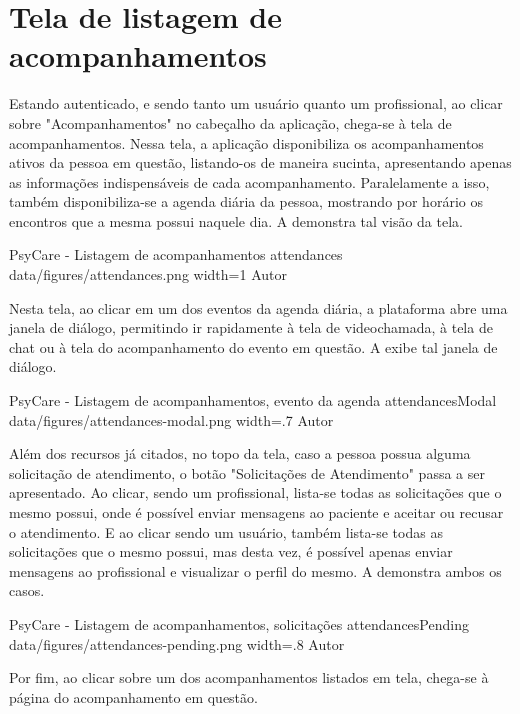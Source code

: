 \section{Tela de listagem de acompanhamentos}
\label{sec:acompanhamentos}

Estando autenticado, e sendo tanto um usuário quanto um profissional, ao clicar sobre "Acompanhamentos" no cabeçalho da aplicação, chega-se à tela de acompanhamentos. Nessa tela, a aplicação disponibiliza os acompanhamentos ativos da pessoa em questão, listando-os de maneira sucinta, apresentando apenas as informações indispensáveis de cada acompanhamento. Paralelamente a isso, também disponibiliza-se a agenda diária da pessoa, mostrando por horário os encontros que a mesma possui naquele dia. A  demonstra tal visão da tela.

\image
    {PsyCare - Listagem de acompanhamentos}
    {attendances}
    {data/figures/attendances.png}
    {width=1\textwidth}
    {Autor}

Nesta tela, ao clicar em um dos eventos da agenda diária, a plataforma abre uma janela de diálogo, permitindo ir rapidamente à tela de videochamada, à tela de chat ou à tela do acompanhamento do evento em questão. A  exibe tal janela de diálogo.

\image
    {PsyCare - Listagem de acompanhamentos, evento da agenda}
    {attendancesModal}
    {data/figures/attendances-modal.png}
    {width=.7\textwidth}
    {Autor}

Além dos recursos já citados, no topo da tela, caso a pessoa possua alguma solicitação de atendimento, o botão "Solicitações de Atendimento" passa a ser apresentado. Ao clicar, sendo um profissional, lista-se todas as solicitações que o mesmo possui, onde é possível enviar mensagens ao paciente e aceitar ou recusar o atendimento. E ao clicar sendo um usuário, também lista-se todas as solicitações que o mesmo possui, mas desta vez, é possível apenas enviar mensagens ao profissional e visualizar o perfil do mesmo. A  demonstra ambos os casos.

\image
    {PsyCare - Listagem de acompanhamentos, solicitações}
    {attendancesPending}
    {data/figures/attendances-pending.png}
    {width=.8\textwidth}
    {Autor}

Por fim, ao clicar sobre um dos acompanhamentos listados em tela, chega-se à página do acompanhamento em questão.